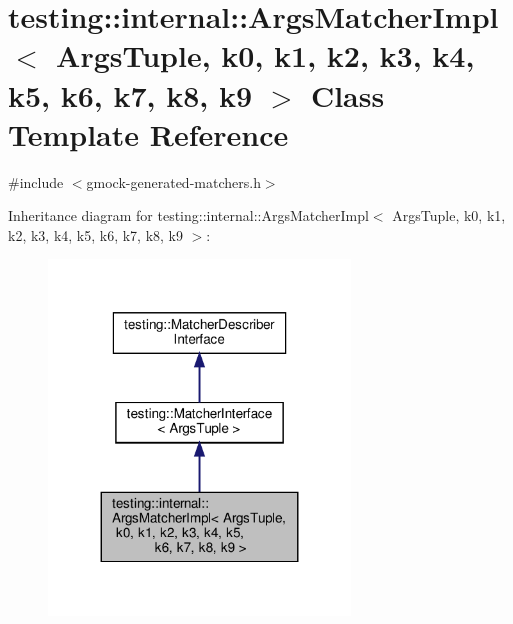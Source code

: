 \hypertarget{classtesting_1_1internal_1_1_args_matcher_impl}{}\section{testing\+:\+:internal\+:\+:Args\+Matcher\+Impl$<$ Args\+Tuple, k0, k1, k2, k3, k4, k5, k6, k7, k8, k9 $>$ Class Template Reference}
\label{classtesting_1_1internal_1_1_args_matcher_impl}


{\ttfamily \#include $<$gmock-\/generated-\/matchers.\+h$>$}



Inheritance diagram for testing\+:\+:internal\+:\+:Args\+Matcher\+Impl$<$ Args\+Tuple, k0, k1, k2, k3, k4, k5, k6, k7, k8, k9 $>$\+:
\nopagebreak
\begin{figure}[H]
\begin{center}
\leavevmode
\includegraphics[width=227pt]{classtesting_1_1internal_1_1_args_matcher_impl__inherit__graph}
\end{center}
\end{figure}


